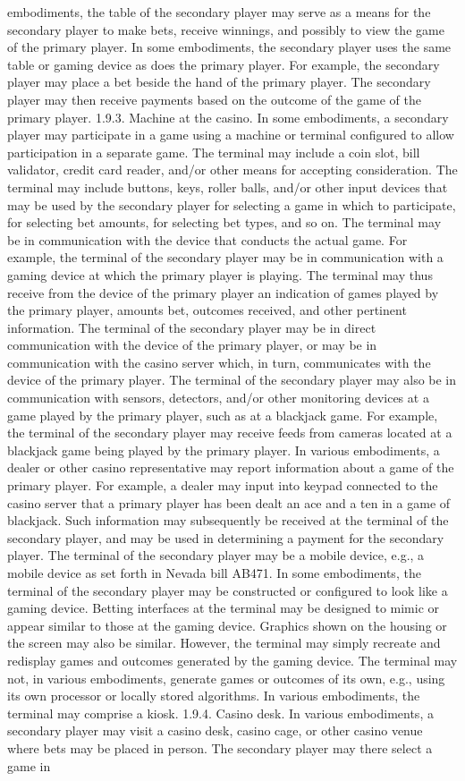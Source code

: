 \documentclass[11pt,a4paper]{article}
\begin{document}
embodiments, the table of the secondary player may serve as a means for the secondary player to make bets, receive winnings, and possibly to view the game of the primary player. In some embodiments, the secondary player uses the same table or gaming device as does the primary player. For example, the secondary player may place a bet beside the hand of the primary player. The secondary player may then receive payments based on the outcome of the game of the primary player. 1.9.3. Machine at the casino. In some embodiments, a secondary player may participate in a game using a machine or terminal configured to allow participation in a separate game. The terminal may include a coin slot, bill validator, credit card reader, and/or other means for accepting consideration. The terminal may include buttons, keys, roller balls, and/or other input devices that may be used by the secondary player for selecting a game in which to participate, for selecting bet amounts, for selecting bet types, and so on. The terminal may be in communication with the device that conducts the actual game. For example, the terminal of the secondary player may be in communication with a gaming device at which the primary player is playing. The terminal may thus receive from the device of the primary player an indication of games played by the primary player, amounts bet, outcomes received, and other pertinent information. The terminal of the secondary player may be in direct communication with the device of the primary player, or may be in communication with the casino server which, in turn, communicates with the device of the primary player. The terminal of the secondary player may also be in communication with sensors, detectors, and/or other monitoring devices at a game played by the primary player, such as at a blackjack game. For example, the terminal of the secondary player may receive feeds from cameras located at a blackjack game being played by the primary player. In various embodiments, a dealer or other casino representative may report information about a game of the primary player. For example, a dealer may input into keypad connected to the casino server that a primary player has been dealt an ace and a ten in a game of blackjack. Such information may subsequently be received at the terminal of the secondary player, and may be used in determining a payment for the secondary player. The terminal of the secondary player may be a mobile device, e.g., a mobile device as set forth in Nevada bill AB471. In some embodiments, the terminal of the secondary player may be constructed or configured to look like a gaming device. Betting interfaces at the terminal may be designed to mimic or appear similar to those at the gaming device. Graphics shown on the housing or the screen may also be similar. However, the terminal may simply recreate and redisplay games and outcomes generated by the gaming device. The terminal may not, in various embodiments, generate games or outcomes of its own, e.g., using its own processor or locally stored algorithms. In various embodiments, the terminal may comprise a kiosk. 1.9.4. Casino desk. In various embodiments, a secondary player may visit a casino desk, casino cage, or other casino venue where bets may be placed in person. The secondary player may there select a game in 
\end{document}
